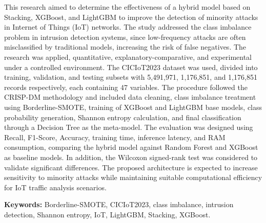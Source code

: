 This research aimed to determine the effectiveness of a hybrid model based on Stacking, XGBoost, and LightGBM to improve the detection of minority attacks in Internet of Things (IoT) networks. The study addressed the class imbalance problem in intrusion detection systems, since low-frequency attacks are often misclassified by traditional models, increasing the risk of false negatives. The research was applied, quantitative, explanatory-comparative, and experimental under a controlled environment. The CICIoT2023 dataset was used, divided into training, validation, and testing subsets with 5,491,971, 1,176,851, and 1,176,851 records respectively, each containing 47 variables. The procedure followed the CRISP-DM methodology and included data cleaning, class imbalance treatment using Borderline-SMOTE, training of XGBoost and LightGBM base models, class probability generation, Shannon entropy calculation, and final classification through a Decision Tree as the meta-model. The evaluation was designed using Recall, F1-Score, Accuracy, training time, inference latency, and RAM consumption, comparing the hybrid model against Random Forest and XGBoost as baseline models. In addition, the Wilcoxon signed-rank test was considered to validate significant differences. The proposed architecture is expected to increase sensitivity to minority attacks while maintaining suitable computational efficiency for IoT traffic analysis scenarios.

\textbf{Keywords:} Borderline-SMOTE, CICIoT2023, class imbalance, intrusion detection, Shannon entropy, IoT, LightGBM, Stacking, XGBoost.
